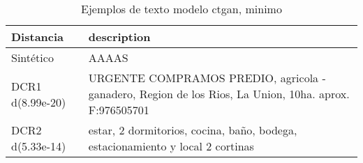 \begin{table}[H]
\centering
\fontsize{10}{14}\selectfont
\caption{Ejemplos de texto modelo ctgan, minimo}
\label{table-example-economicos-b-1-ctgan-min-text}
\begin{tabular}{|l|m{35em}|}
\hline
\rowcolor[gray]{0.8}
Distancia & description \\
\hline Sintético & AAAAS \\
\hline DCR1 d(8.99e-20) & URGENTE COMPRAMOS PREDIO, agricola - ganadero, Region de los Rios, La Union, 10ha. aprox. F:976505701 \\
\hline DCR2 d(5.33e-14) & estar, 2 dormitorios, cocina, ba\~no, bodega, estacionamiento y local 2 cortinas \\
\hline
\end{tabular}
\end{table}
